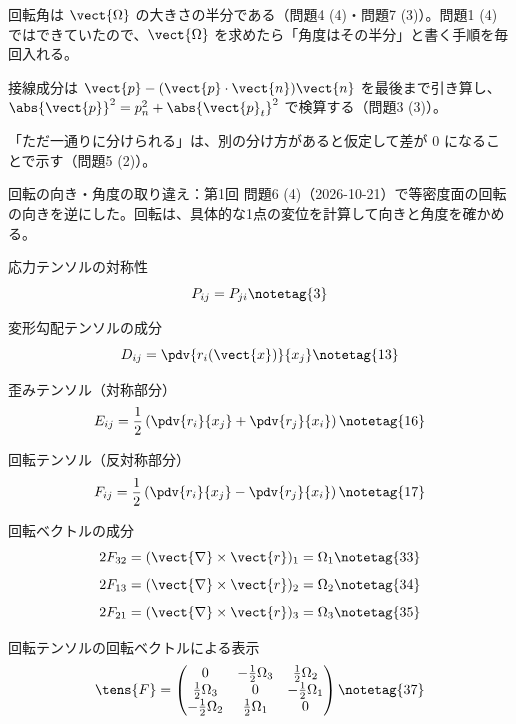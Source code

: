 \documentclass[uplatex,dvipdfmx,a4paper,11pt]{jsarticle}
\begin{document}
\matome
\begin{saitenichiran}
\end{saitenichiran}
\begin{daiji}
  \item 回転角は $\vect{\Omega}$ の大きさの半分である（問題4 (4)・問題7 (3)）。問題1 (4) ではできていたので、$\vect{\Omega}$ を求めたら「角度はその半分」と書く手順を毎回入れる。
  \item 接線成分は $\vect{p}-(\vect{p}\cdot\vect{n})\vect{n}$ を最後まで引き算し、$\abs{\vect{p}}^{2}=p_{n}^{2}+\abs{\vect{p}_{t}}^{2}$ で検算する（問題3 (3)）。
  \item 「ただ一通りに分けられる」は、別の分け方があると仮定して差が 0 になることで示す（問題5 (2)）。
\end{daiji}
\begin{maemo}
  \item 回転の向き・角度の取り違え：第1回 問題6 (4)（2026-10-21）で等密度面の回転の向きを逆にした。回転は、具体的な1点の変位を計算して向きと角度を確かめる。
\end{maemo}

\youtenseiri
\begin{noteshikilist}
  \item 応力テンソルの対称性 %
    \[ P_{ij}=P_{ji} \notetag{3} \]
  \item 変形勾配テンソルの成分 %
    \[ D_{ij}=\pdv{r_i(\vect{x})}{x_j} \notetag{13} \]
  \item 歪みテンソル（対称部分） %
    \[ E_{ij}=\frac{1}{2}\left(\pdv{r_i}{x_j}+\pdv{r_j}{x_i}\right) \notetag{16} \]
  \item 回転テンソル（反対称部分） %
    \[ F_{ij}=\frac{1}{2}\left(\pdv{r_i}{x_j}-\pdv{r_j}{x_i}\right) \notetag{17} \]
  \item 回転ベクトルの成分 %
    \[ 2F_{32}=(\vect{\nabla}\times\vect{r})_1=\Omega_1 \notetag{33} \]
    \[ 2F_{13}=(\vect{\nabla}\times\vect{r})_2=\Omega_2 \notetag{34} \]
    \[ 2F_{21}=(\vect{\nabla}\times\vect{r})_3=\Omega_3 \notetag{35} \]
  \item 回転テンソルの回転ベクトルによる表示 %
    \[ \tens{F}=\begin{pmatrix} 0 & -\frac{1}{2}\Omega_3 & \frac{1}{2}\Omega_2\\ \frac{1}{2}\Omega_3 & 0 & -\frac{1}{2}\Omega_1\\ -\frac{1}{2}\Omega_2 & \frac{1}{2}\Omega_1 & 0 \end{pmatrix} \notetag{37} \]
\end{noteshikilist}
\end{document}
